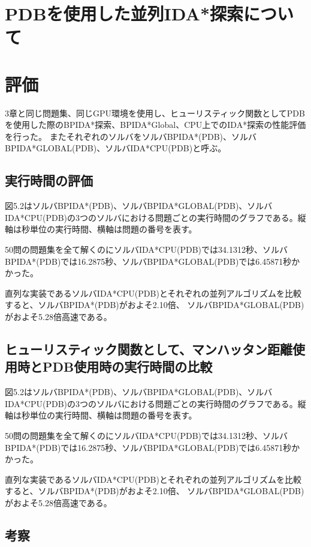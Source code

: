 \documentclass[a4paper,11pt,oneside,openany]{jsbook}
\begin{document}
\section{PDBを使用した並列IDA*探索について}
\section{評価}
3章と同じ問題集、同じGPU環境を使用し、ヒューリスティック関数としてPDBを使用した際のBPIDA*探索、BPIDA*Global、CPU上でのIDA*探索の性能評価を行った。
またそれぞれのソルバをソルバBPIDA*(PDB)、ソルバBPIDA*GLOBAL(PDB)、ソルバIDA*CPU(PDB)と呼ぶ。

\subsection{実行時間の評価}

図5.2はソルバBPIDA*(PDB)、ソルバBPIDA*GLOBAL(PDB)、ソルバIDA*CPU(PDB)の3つのソルバにおける問題ごとの実行時間のグラフである。縦軸は秒単位の実行時間、横軸は問題の番号を表す。

50問の問題集を全て解くのにソルバIDA*CPU(PDB)では34.1312秒、ソルバBPIDA*(PDB)では16.2875秒、ソルバBPIDA*GLOBAL(PDB)では6.45871秒かかった。

直列な実装であるソルバIDA*CPU(PDB)とそれぞれの並列アルゴリズムを比較すると、ソルバBPIDA*(PDB)がおよそ2.10倍、
ソルバBPIDA*GLOBAL(PDB)がおよそ5.28倍高速である。

\subsection{ヒューリスティック関数として、マンハッタン距離使用時とPDB使用時の実行時間の比較}



図5.2はソルバBPIDA*(PDB)、ソルバBPIDA*GLOBAL(PDB)、ソルバIDA*CPU(PDB)の3つのソルバにおける問題ごとの実行時間のグラフである。縦軸は秒単位の実行時間、横軸は問題の番号を表す。

50問の問題集を全て解くのにソルバIDA*CPU(PDB)では34.1312秒、ソルバBPIDA*(PDB)では16.2875秒、ソルバBPIDA*GLOBAL(PDB)では6.45871秒かかった。

直列な実装であるソルバIDA*CPU(PDB)とそれぞれの並列アルゴリズムを比較すると、ソルバBPIDA*(PDB)がおよそ2.10倍、
ソルバBPIDA*GLOBAL(PDB)がおよそ5.28倍高速である。


\subsection{考察}
\end{document}
